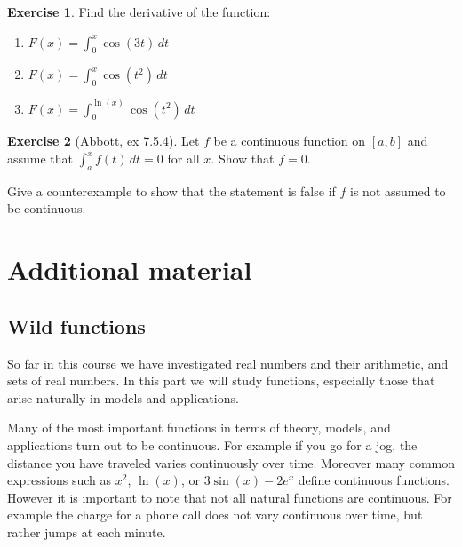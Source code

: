 \documentclass[11pt,oneside]{amsbook}
\theoremstyle{definition}
\newtheorem{exerc}{Exercise}[section]
\theoremstyle{plain}
\theoremstyle{definition}
\theoremstyle{remark}
\numberwithin{equation}{section}
\numberwithin{figure}{section}
\begin{document}
\begin{exerc}
  Find the derivative of the function:
  \begin{enumerate}
    \item $F(x)=\int_0^x \cos(3t)\,dt$
    \item $F(x)=\int_0^x \cos(t^2)\,dt$
    \item $F(x)=\int_0^{\ln(x)} \cos(t^2)\,dt$
  \end{enumerate}
\end{exerc}

\begin{exerc}[Abbott, ex 7.5.4]
  Let $f$ be a continuous function on $[a,b]$ and assume that $\int_a^xf(t)\,dt=0$ for all $x$. Show that $f=0$.
  
  Give a counterexample to show that the statement is false if $f$ is not assumed to be continuous.
\end{exerc}

\iffalse
\chapter{Additional material}

\section{Wild functions}

So far in this course we have investigated real numbers and their arithmetic, and sets of real numbers. In this part we will study functions, especially those that arise naturally in models and applications.

Many of the most important functions in terms of theory, models, and applications turn out to be continuous. For example if you go for a jog, the distance you have traveled varies continuously over time. Moreover many common expressions such as $x^2$, $\ln(x)$, or $3\sin(x)-2e^x$ define continuous functions. However it is important to note that not all natural functions are continuous. For example the charge for a phone call does not vary continuous over time, but rather jumps at each minute.
\end{document}

